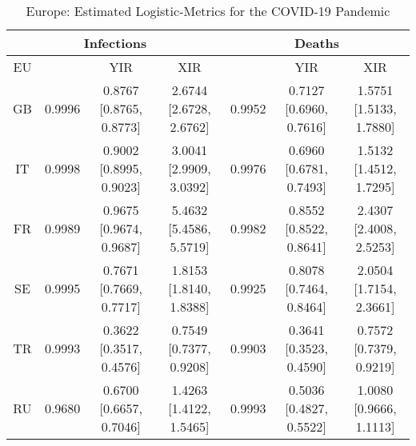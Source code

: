 \documentclass[journal]{IEEEtran}
\theoremstyle{plain}
\theoremstyle{definition}
\theoremstyle{remark}
\begin{document}
\begin{table*}[t]
	\caption{Europe: Estimated Logistic-Metrics for the COVID-19 Pandemic}
	\centering
	\def\arraystretch{1.5}\begin{tabular}{|c|c|c|c|c|c|c|}
	\hline
	\multicolumn{4}{|c||}{Infections}&
	\multicolumn{3}{c|}{Deaths}\\
	\hline\hline
	EU &  & YIR & XIR &  & YIR & XIR \\
	\hline\hline
	GB& 0.9996& 0.8767 [0.8765, 0.8773]& 2.6744 [2.6728, 2.6762]  &  0.9952 & 0.7127 [0.6960, 0.7616] &  1.5751	[1.5133, 1.7880] \\
	\hline
	IT&  0.9998&  0.9002 [0.8995, 0.9023]& 3.0041 [2.9909, 3.0392]
	  & 0.9976  & 0.6960 [0.6781, 0.7493] &  1.5132	[1.4512, 1.7295] \\
	\hline
	FR&  0.9989&  0.9675 [0.9674, 0.9687]& 5.4632 [5.4586, 5.5719]
	& 0.9982 & 	0.8552	[0.8522, 0.8641] & 2.4307 [2.4008,	2.5253] \\
	\hline
	SE&  0.9995& 0.7671	[0.7669,	0.7717]
	 & 1.8153	[1.8140,	1.8388]& 0.9925& 0.8078	[0.7464, 0.8464]  & 2.0504	[1.7154, 2.3661]\\
	\hline
	TR&  0.9993&  0.3622	[0.3517,	0.4576]
	& 0.7549 [0.7377,	0.9208]& 0.9903	& 0.3641 [0.3523, 0.4590]  & 0.7572 [0.7379, 0.9219] \\
	\hline
	RU&  0.9680& 0.6700	[0.6657,	0.7046]
	 & 1.4263	[1.4122,	1.5465] &0.9993 &  0.5036 [0.4827, 0.5522]&  1.0080 [0.9666, 1.1113] \\
	\hline
\end{tabular}
\label{table_eu}
\end{table*}
\end{document}
